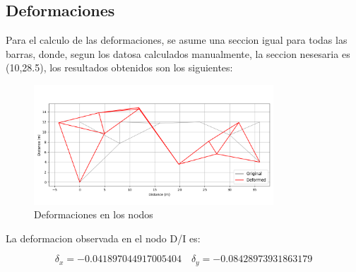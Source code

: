 \subsection{Deformaciones}

Para el calculo de las deformaciones, se asume una seccion igual para todas las barras, donde, segun los datosa calculados manualmente, la seccion nesesaria es (10,28.5), los resultados obtenidos son los siguientes:

\begin{figure}[H]
    \centering
    \includegraphics[width=0.8\textwidth]{GRAFICOS/deformed_truss.png}
    \caption{Deformaciones en los nodos}
    \label{fig:deformaciones}
\end{figure}

La deformacion observada en el nodo D/I es:

\begin{equation}
    \delta_x = -0.041897044917005404 \quad \delta_y =  -0.08428973931863179
\end{equation}




